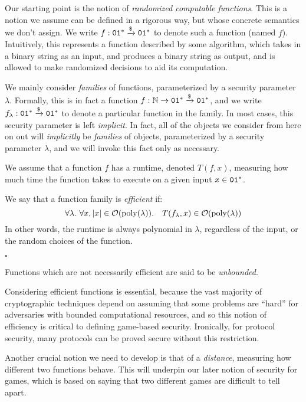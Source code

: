 Our starting point is the notion of \emph{randomized computable functions}.
This is a notion we assume can be defined in a rigorous way, but whose
concrete semantics we don't assign.
We write $f : \texttt{01}^* \xrightarrow{\$} \texttt{01}^*$ to denote such a function (named $f$).
Intuitively, this represents a function described by some algorithm,
which takes in a binary string as an input, and produces a binary string
as output, and is allowed to make randomized decisions to aid its computation.

We mainly consider \emph{families} of functions,
parameterized by a security parameter $\lambda$.
Formally, this is in fact a function $f : \mathbb{N} \to \texttt{01}^* \xrightarrow{\$} \texttt{01}^*$,
and we write $f_{\lambda} : \texttt{01}^* \xrightarrow{\$} \texttt{01}^*$ to denote a particular
function in the family.
In most cases, this security parameter is left \emph{implicit}.
In fact, all of the objects we consider from here on out will \emph{implicitly}
be \emph{families} of objects, parameterized by a security parameter $\lambda$,
and we will invoke this fact only as necessary.

\begin{definition}
    We assume that a function $f$ has a runtime, denoted $T(f, x)$,
    measuring how much time the function takes to execute on a given input $x \in \texttt{01}^*$.

    We say that a function family is \emph{efficient} if:
    $$
    \forall \lambda.\ \forall x, |x| \in \mathcal{O}(\text{poly}(\lambda)).\quad T(f_\lambda, x) \in \mathcal{O}(\text{poly}(\lambda))
    $$
    In other words, the runtime is always polynomial in $\lambda$, regardless
    of the input, or the random choices of the function.

    $\square$
\end{definition}

Functions which are not necessarily efficient are said to be \emph{unbounded}.

Considering efficient functions is essential, because the vast majority
of cryptographic techniques depend on assuming that some problems are ``hard''
for adversaries with bounded computational resources,
and so this notion of efficiency is critical to defining game-based
security.
Ironically, for protocol security, many protocols can be proved secure
without this restriction.

Another crucial notion we need to develop is that of a \emph{distance},
measuring how different two functions behave.
This will underpin our later notion of security for games,
which is based on saying that two different games are difficult
to tell apart.

